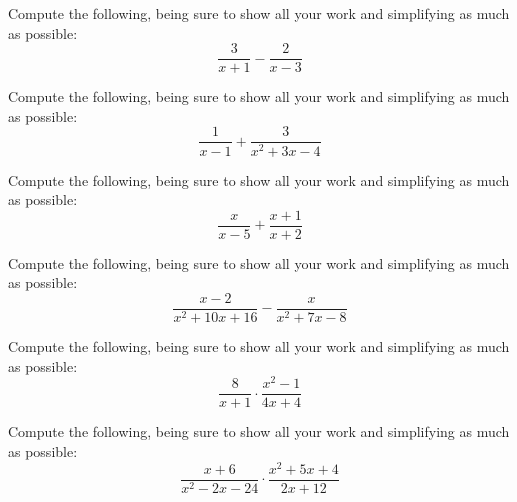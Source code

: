 \documentclass[11pt,letterpaper]{article}
\begin{document}

 Compute the following, being sure to show all your work and simplifying as much as possible:
	\[
	\dfrac{3}{x + 1} - \dfrac{2}{x - 3}
	\]





\newpage





 Compute the following, being sure to show all your work and simplifying as much as possible:
	\[
	\dfrac{1}{x - 1} + \dfrac{3}{x^2 + 3x - 4}
	\]





\newpage





 Compute the following, being sure to show all your work and simplifying as much as possible:
	\[
	\dfrac{x}{x - 5} + \dfrac{x + 1}{x + 2}
	\]





\newpage





 Compute the following, being sure to show all your work and simplifying as much as possible:
	\[
	\dfrac{x - 2}{x^2 + 10x + 16} - \dfrac{x}{x^2 + 7x - 8}
	\]





\newpage





 Compute the following, being sure to show all your work and simplifying as much as possible:
	\[
	\dfrac{8}{x + 1} \cdot \dfrac{x^2 - 1}{4x + 4}
	\]





\newpage





 Compute the following, being sure to show all your work and simplifying as much as possible:
	\[
	\dfrac{x + 6}{x^2 - 2x - 24} \cdot \dfrac{x^2 + 5x + 4}{2x + 12}
	\]
\end{document}
